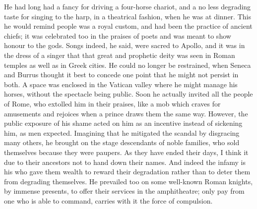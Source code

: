 
He had long had a fancy for driving a four-horse chariot, and a no less degrading taste for singing to the harp, in a theatrical fashion, when he was at dinner. This he would remind people was a royal custom, and had been the practice of ancient chiefs; it was celebrated too in the praises of poets and was meant to show honour to the gods. Songs indeed, he said, were sacred to Apollo, and it was in the dress of a singer that that great and prophetic deity was seen in Roman temples as well as in Greek cities. He could no longer be restrained, when Seneca and Burrus thought it best to concede one point that he might not persist in both. A space was enclosed in the Vatican valley where he might manage his horses, without the spectacle being public. Soon he actually invited all the people of Rome, who extolled him in their praises, like a mob which craves for amusements and rejoices when a prince draws them the same way. However, the public exposure of his shame acted on him as an incentive instead of sickening him, as men expected. Imagining that he mitigated the scandal by disgracing many others, he brought on the stage descendants of noble families, who sold themselves because they were paupers. As they have ended their days, I think it due to their ancestors not to hand down their names. And indeed the infamy is his who gave them wealth to reward their degradation rather than to deter them from degrading themselves. He prevailed too on some well-known Roman knights, by immense presents, to offer their services in the amphitheatre; only pay from one who is able to command, carries with it the force of compulsion.


